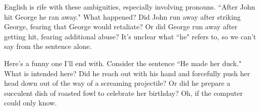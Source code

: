 English is rife with these ambiguities, especially involving pronouns.
``After John hit George he ran away." What happened? Did John run away
after striking George, fearing that George would retaliate? Or did George
run away after getting hit, fearing additional abuse? It's unclear what
``he" refers to, so we can't say from the sentence alone. 

Here's a funny one I'll end with. Consider the sentence ``He made her
duck." What is intended here? Did he reach out with his hand and forcefully
push her head down out of the way of a screaming projectile? Or did he
prepare a succulent dish of roasted fowl to celebrate her birthday? Oh, if
the computer could only know.



